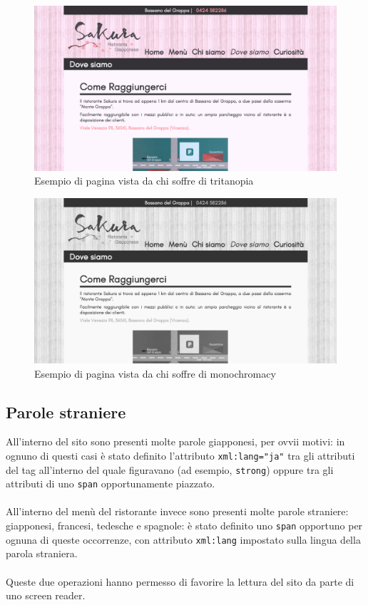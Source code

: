 \documentclass[../relazione.tex]{subfiles}
\begin{document}
	\begin{figure}[H]
	\centering
		\includegraphics[width=\textwidth]{images/colorblindness/tritanopia}
		\caption{Esempio di pagina vista da chi soffre di tritanopia}
		\label{fig:Esempio di pagina vista da chi soffre di tritanopia}
	\end{figure}
	\begin{figure}[H]
	\centering
		\includegraphics[width=\textwidth]{images/colorblindness/monochromacy}
		\caption{Esempio di pagina vista da chi soffre di monochromacy}
		\label{fig:Esempio di pagina vista da chi soffre di monochromacy}
	\end{figure}
	
	\subsection{Parole straniere}
		All'interno del sito sono presenti molte parole giapponesi, per ovvii motivi: in ognuno di questi casi è stato definito l'attributo \texttt{xml:lang="ja"} tra gli attributi del tag all'interno del quale figuravano (ad esempio, \texttt{strong}) oppure tra gli attributi di uno \texttt{span} opportunamente piazzato.\\\\
		All'interno del menù del ristorante invece sono presenti molte parole straniere: giapponesi, francesi, tedesche e spagnole: è stato definito uno \texttt{span} opportuno per ognuna di queste occorrenze, con attributo \texttt{xml:lang} impostato sulla lingua della parola straniera.\\\\
		Queste due operazioni hanno permesso di favorire la lettura del sito da parte di uno screen reader.
	
\end{document}
